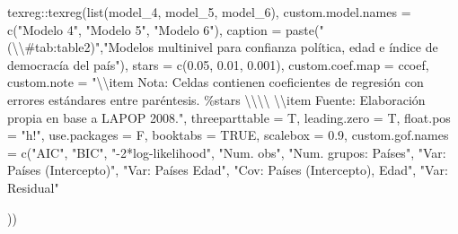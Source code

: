 \documentclass[
  12pt,
  a4paper,
]{article}
\newenvironment{Shaded}{\begin{snugshade}}{\end{snugshade}}
\newcommand{\AttributeTok}[1]{\textcolor[rgb]{0.77,0.63,0.00}{#1}}
\newcommand{\ConstantTok}[1]{\textcolor[rgb]{0.00,0.00,0.00}{#1}}
\newcommand{\FloatTok}[1]{\textcolor[rgb]{0.00,0.00,0.81}{#1}}
\newcommand{\FunctionTok}[1]{\textcolor[rgb]{0.00,0.00,0.00}{#1}}
\newcommand{\NormalTok}[1]{#1}
\newcommand{\SpecialCharTok}[1]{\textcolor[rgb]{0.00,0.00,0.00}{#1}}
\newcommand{\StringTok}[1]{\textcolor[rgb]{0.31,0.60,0.02}{#1}}
\begin{document}
\begin{Shaded}
\begin{Highlighting}[]
\NormalTok{texreg}\SpecialCharTok{::}\FunctionTok{texreg}\NormalTok{(}\FunctionTok{list}\NormalTok{(model\_4, model\_5, model\_6),}
               \AttributeTok{custom.model.names =} \FunctionTok{c}\NormalTok{(}\StringTok{"Modelo 4"}\NormalTok{,}
                                      \StringTok{"Modelo 5"}\NormalTok{,}
                                      \StringTok{"Modelo 6"}\NormalTok{),}
               \AttributeTok{caption =} \FunctionTok{paste}\NormalTok{(}\StringTok{"(}\SpecialCharTok{\textbackslash{}\textbackslash{}}\StringTok{\#tab:table2)"}\NormalTok{,}\StringTok{"Modelos multinivel para confianza política, edad e índice de democracía del país"}\NormalTok{),}
               \AttributeTok{stars =} \FunctionTok{c}\NormalTok{(}\FloatTok{0.05}\NormalTok{, }\FloatTok{0.01}\NormalTok{, }\FloatTok{0.001}\NormalTok{),}
               \AttributeTok{custom.coef.map =}\NormalTok{ ccoef,}
               \AttributeTok{custom.note =} \StringTok{"}\SpecialCharTok{\textbackslash{}\textbackslash{}}\StringTok{item Nota: Celdas contienen coeficientes de regresión con errores estándares entre paréntesis. \%stars }\SpecialCharTok{\textbackslash{}\textbackslash{}\textbackslash{}\textbackslash{}}\StringTok{ }\SpecialCharTok{\textbackslash{}\textbackslash{}}\StringTok{item Fuente: Elaboración propia en base a LAPOP 2008."}\NormalTok{,}
               \AttributeTok{threeparttable =}\NormalTok{ T,}
               \AttributeTok{leading.zero =}\NormalTok{ T,}
               \AttributeTok{float.pos =} \StringTok{"h!"}\NormalTok{,}
               \AttributeTok{use.packages =}\NormalTok{ F,}
               \AttributeTok{booktabs =} \ConstantTok{TRUE}\NormalTok{,}
               \AttributeTok{scalebox =} \FloatTok{0.9}\NormalTok{,}
               \AttributeTok{custom.gof.names =} \FunctionTok{c}\NormalTok{(}\StringTok{"AIC"}\NormalTok{, }
                                    \StringTok{"BIC"}\NormalTok{, }
                                    \StringTok{"{-}2*log{-}likelihood"}\NormalTok{, }
                                    \StringTok{"Num. obs"}\NormalTok{, }
                                    \StringTok{"Num. grupos: Países"}\NormalTok{,}
                                    \StringTok{"Var: Países (Intercepto)"}\NormalTok{,}
                                    \StringTok{"Var: Países Edad"}\NormalTok{,}
                                    \StringTok{"Cov: Países (Intercepto), Edad"}\NormalTok{,}
                                    \StringTok{"Var: Residual"}
                                     
\NormalTok{                                    ))}


\end{Highlighting}
\end{Shaded}
\end{document}
